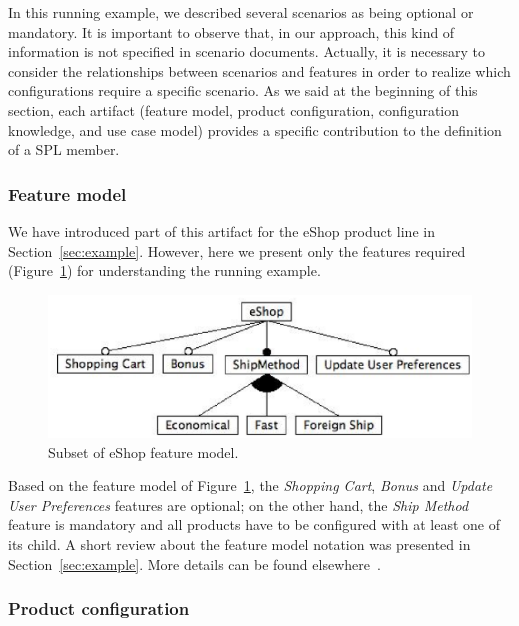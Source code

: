 \documentclass{report}
\begin{document}
\begin{frontmatter}
In this running example, we described several scenarios as being optional or
mandatory. It is important to observe that, in our approach, this kind of
information is not specified in scenario documents. Actually, it is necessary to
consider the relationships between scenarios and features in order to realize
which configurations require a specific scenario. As we said at the beginning of
this section, each artifact (feature model, product configuration, configuration
knowledge, and use case model) provides a specific contribution to the definition
of a SPL member.

\subsubsection{Feature model}\label{subsub:fm}

We have introduced part of this artifact for the eShop product line in
Section~\ref{sec:example}. However, here we present only the features required 
(Figure~\ref{fig:eshop-fm-re}) for understanding the running example.

 \begin{figure}[h]
 \begin{center}
  \includegraphics[scale=0.40]{img/eShop-fm-re.eps}
   \nocaptionrule \caption{Subset of eShop feature model.}
  \label{fig:eshop-fm-re}
  \end{center}
\end{figure}

Based on the feature model of Figure~\ref{fig:eshop-fm-re}, the \emph{Shopping
Cart}, \emph{Bonus} and \emph{Update User Preferences} features are optional;
on the other hand, the \emph{Ship Method} feature is mandatory and all products
have to be configured with at least one of its child. A short review about the
feature model notation was presented in Section~\ref{sec:example}. More details
can be found elsewhere~\cite{gheyi-alloy-06,czarnecki-book}.

\subsubsection{Product configuration}\label{subsub:pc}


\end{frontmatter}
\end{document}

